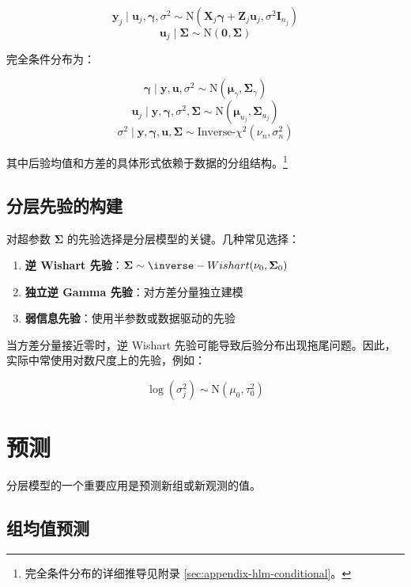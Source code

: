 \[
\mathbf{y}_j \mid \mathbf{u}_j, \boldsymbol{\gamma}, \sigma^2 \sim \mathrm{N}(\mathbf{X}_j\boldsymbol{\gamma} + \mathbf{Z}_j\mathbf{u}_j, \sigma^2 \mathbf{I}_{n_j})
\]
\[
\mathbf{u}_j \mid \boldsymbol{\Sigma} \sim \mathrm{N}(\mathbf{0}, \boldsymbol{\Sigma})
\]

完全条件分布为：

\[
\boldsymbol{\gamma} \mid \mathbf{y}, \mathbf{u}, \sigma^2 \sim \mathrm{N}(\boldsymbol{\mu}_\gamma, \boldsymbol{\Sigma}_\gamma)
\]
\[
\mathbf{u}_j \mid \mathbf{y}, \boldsymbol{\gamma}, \sigma^2, \boldsymbol{\Sigma} \sim \mathrm{N}(\boldsymbol{\mu}_{u_j}, \boldsymbol{\Sigma}_{u_j})
\]
\[
\sigma^2 \mid \mathbf{y}, \boldsymbol{\gamma}, \mathbf{u}, \boldsymbol{\Sigma} \sim \text{Inverse-}\chi^2(\nu_n, \sigma_n^2)
\]

其中后验均值和方差的具体形式依赖于数据的分组结构。\footnote{完全条件分布的详细推导见附录 \cref{sec:appendix-hlm-conditional}。}

\subsection{分层先验的构建}
\label{sec:hierarchical-prior}

对超参数 $\boldsymbol{\Sigma}$ 的先验选择是分层模型的关键。几种常见选择：

\begin{enumerate}
  \item \textbf{逆 Wishart 先验}：$\boldsymbol{\Sigma} \sim \inverse-Wishart(\nu_0, \boldsymbol{\Sigma}_0)$
  \item \textbf{独立逆 Gamma 先验}：对方差分量独立建模
  \item \textbf{弱信息先验}：使用半参数或数据驱动的先验
\end{enumerate}

当方差分量接近零时，逆 Wishart 先验可能导致后验分布出现拖尾问题。因此，实际中常使用对数尺度上的先验，例如：

\[
\log(\sigma_j^2) \sim \mathrm{N}(\mu_0, \tau_0^2)
\]

\section{预测}
\label{sec:prediction-hlm}

分层模型的一个重要应用是预测新组或新观测的值。

\subsection{组均值预测}
\label{sec:group-mean-prediction}

